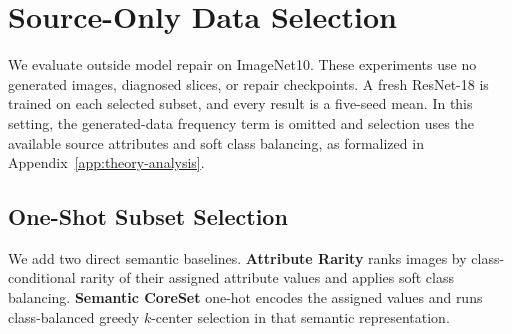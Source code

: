\section{Source-Only Data Selection}
\label{app:source-only-selection}

We evaluate \model outside model repair on ImageNet10. These experiments use no generated images, diagnosed slices, or repair checkpoints. A fresh ResNet-18 is trained on each selected subset, and every result is a five-seed mean. In this setting, the generated-data frequency term is omitted and selection uses the available source attributes and soft class balancing, as formalized in Appendix~\ref{app:theory-analysis}.

\subsection{One-Shot Subset Selection}

We add two direct semantic baselines. \textbf{Attribute Rarity} ranks images by class-conditional rarity of their assigned attribute values and applies soft class balancing. \textbf{Semantic CoreSet} one-hot encodes the assigned values and runs class-balanced greedy $k$-center selection in that semantic representation.

\begin{table}[htbp]
\centering
\caption{ImageNet10 source-only one-shot data selection. Metric: five-seed mean test accuracy (\%).}
\label{tab:source-only-one-shot}
\small
\setlength{\tabcolsep}{3pt}
\end{table}

